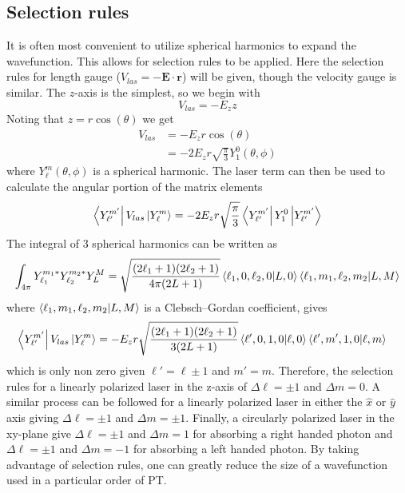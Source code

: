 \subsection{Selection rules} %
\label{sub:selection_rules}
It is often most convenient to utilize spherical harmonics to expand the wavefunction. This allows for selection rules to be applied. Here the selection rules for length gauge ($V_{las}=-\mathbf{E}\cdot \mathbf{r}$) will be given, though the velocity gauge is similar. The $z$-axis is the simplest, so we begin with 
\begin{equation}
    V_{las}=-E_zz
\end{equation}
Noting that $z=r\cos(\theta)$ we get 
\begin{align}
    V_{las}&=-E_zr\cos(\theta)\\
    &=-2E_zr\sqrt{\frac{\pi}{3}}Y_1^0(\theta,\phi)
\end{align}
where $Y_\ell^m(\theta,\phi)$ is a spherical harmonic. The laser term can then be used to calculate the angular portion of the matrix elements 
\begin{equation}
    \bra{Y_{\ell'}^{m'}}V_{las}\ket{Y_{\ell}^{m}} = -2E_zr\sqrt{\frac{\pi}{3}}\bra{Y_{\ell'}^{m'}}Y_1^0\ket{Y_{\ell'}^{m'}}
\end{equation}
The integral of 3 spherical harmonics can be written as 
\begin{equation}
    \int_{4\pi} Y_{\ell_1}^{m_1*}Y_{\ell_2}^{m_2*}Y_{L}^{M} = \sqrt{\frac{(2\ell_1+1)(2\ell_2+1)}{4\pi(2L+1)}}\bra{\ell_1,0,\ell_2,0}\ket{L,0}\bra{\ell_1,m_1,\ell_2,m_2}\ket{L,M}
\end{equation}
where $\bra{\ell_1,m_1,\ell_2,m_2}\ket{L,M}$ is a Clebsch–Gordan coefficient, gives
\begin{align}
    \bra{Y_{\ell'}^{m'}}V_{las}\ket{Y_{\ell}^{m}} &= -E_zr\sqrt{\frac{(2\ell_1+1)(2\ell_2+1)}{3(2L+1)}}\bra{\ell',0,1,0}\ket{\ell,0}\bra{\ell',m',1,0}\ket{\ell,m}
\end{align}
which is only non zero given $\ell' = \ell \pm 1$ and $m'=m$. Therefore, the selection rules for a linearly polarized laser in the z-axis of $\Delta\ell=\pm1$ and $\Delta m = 0$. A similar process can be followed for a linearly polarized laser in either the $\hat{x}$ or $\hat{y}$ axis giving $\Delta\ell=\pm1$ and $\Delta m = \pm1$. Finally, a circularly polarized laser in the xy-plane give $\Delta\ell=\pm1$ and $\Delta m = 1$ for absorbing a right handed photon and $\Delta\ell=\pm1$ and $\Delta m = -1$ for absorbing a left handed photon. By taking advantage of selection rules, one can greatly reduce the size of a wavefunction used in a particular order of PT.

